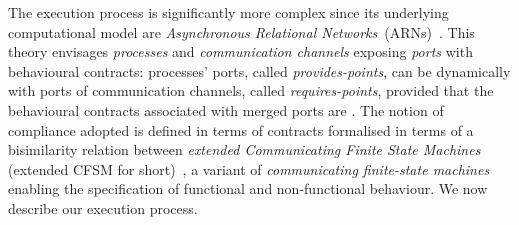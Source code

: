 %
The execution process is significantly more
complex since its underlying computational model are
\emph{Asynchronous Relational Networks}~(ARNs)~\cite{fiadeiro:tcs-503}.
%
This theory envisages \emph{processes} and \emph{communication
  channels} exposing \emph{ports} with behavioural contracts:
processes' ports, called \emph{provides-points}, can be dynamically
 with ports of communication channels, called
\emph{requires-points}, provided that the behavioural contracts
associated with merged ports are .
%
The notion of compliance adopted is defined in terms of
contracts formalised in terms of a bisimilarity relation
between \emph{extended Communicating Finite State Machines} (extended
CFSM for short)~\cite{lopezpombo:coordination25}, a variant of
\emph{communicating finite-state machines}~\cite{brand:jacm-30_2}
enabling the specification of functional and non-functional behaviour.
%
We now describe our execution process.

